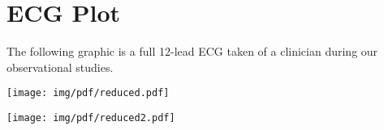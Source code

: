 \section{ECG Plot} %
\label{sec:ecg_plot}


The following graphic is a full 12-lead ECG taken of a clinician during our observational studies.\\
\newline

\texttt{[image: img/pdf/reduced.pdf]}

\texttt{[image: img/pdf/reduced2.pdf]}